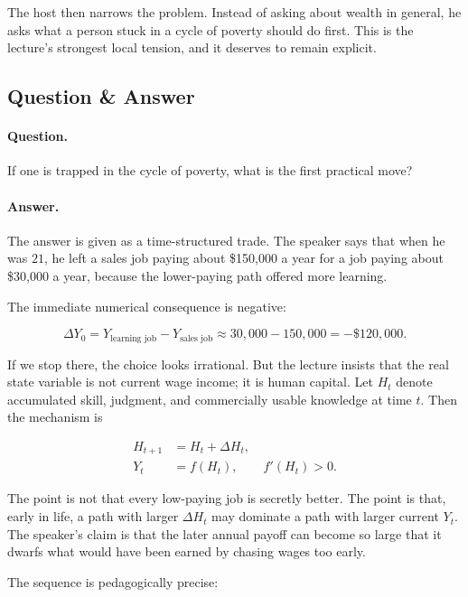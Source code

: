 The host then narrows the problem. Instead of asking about wealth in general, he asks what a person stuck in a cycle of poverty should do first. This is the lecture's strongest local tension, and it deserves to remain explicit.

\subsection{Question \& Answer}

\paragraph{Question.} If one is trapped in the cycle of poverty, what is the first practical move?

\paragraph{Answer.} The answer is given as a time-structured trade. The speaker says that when he was \(21\), he left a sales job paying about \$150{,}000 a year for a job paying about \$30{,}000 a year, because the lower-paying path offered more learning.

The immediate numerical consequence is negative:

\begin{equation}
\Delta Y_0
=
Y_{\text{learning job}}-Y_{\text{sales job}}
\approx
30{,}000-150{,}000
=
-\$120{,}000.
\end{equation}

If we stop there, the choice looks irrational. But the lecture insists that the real state variable is not current wage income; it is human capital. Let \(H_t\) denote accumulated skill, judgment, and commercially usable knowledge at time \(t\). Then the mechanism is

\begin{align}
H_{t+1} &= H_t+\Delta H_t, \\
Y_t &= f(H_t), \qquad f'(H_t)>0.
\end{align}

The point is not that every low-paying job is secretly better. The point is that, early in life, a path with larger \(\Delta H_t\) may dominate a path with larger current \(Y_t\). The speaker's claim is that the later annual payoff can become so large that it dwarfs what would have been earned by chasing wages too early.

The sequence is pedagogically precise:

